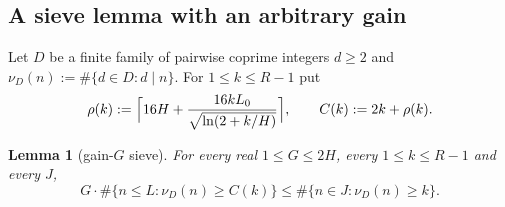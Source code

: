 \documentclass[11pt]{article}
\newtheorem{lemma}[theorem]{Lemma}
\theoremstyle{definition}
\begin{document}
\subsection*{A sieve lemma with an arbitrary gain}
Let $D$ be a finite family of pairwise coprime integers $d\ge2$ and $\nu_D(n):=\#\{d\in D:d\mid n\}$. For $1\le k\le R-1$ put
\begin{equation}\label{eq:rho}
\rho(k):=\Bigl\lceil16H+\frac{16kL_0}{\sqrt{\ln(2+k/H)}}\Bigr\rceil,\qquad C(k):=2k+\rho(k).
\end{equation}

\begin{lemma}[gain-$G$ sieve]\label{lem:gain}
For every real $1\le G\le2H$, every $1\le k\le R-1$ and every $J$,
\[
G\cdot\#\{n\le L:\nu_D(n)\ge C(k)\}\le\#\{n\in J:\nu_D(n)\ge k\}.
\]
\end{lemma}
\end{document}
